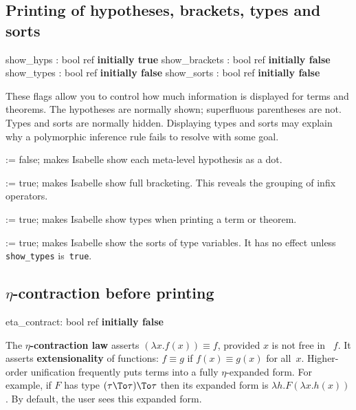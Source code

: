 \subsection{Printing of hypotheses, brackets, types and sorts}
\begin{ttbox} 
show_hyps     : bool ref \hfill{\bf initially true}
show_brackets : bool ref \hfill{\bf initially false}
show_types    : bool ref \hfill{\bf initially false}
show_sorts    : bool ref \hfill{\bf initially false}
\end{ttbox}
These flags allow you to control how much information is displayed for
terms and theorems.  The hypotheses are normally shown; superfluous
parentheses are not.  Types and sorts are normally hidden.  Displaying
types and sorts may explain why a polymorphic inference rule fails to
resolve with some goal.

\begin{ttdescription}
\item[\ttindexbold{show_hyps} := false;]   
makes Isabelle show each meta-level hypothesis as a dot.

\item[\ttindexbold{show_brackets} := true;] 
  makes Isabelle show full bracketing.  This reveals the
  grouping of infix operators.

\item[\ttindexbold{show_types} := true;]
makes Isabelle show types when printing a term or theorem.

\item[\ttindexbold{show_sorts} := true;]
makes Isabelle show the sorts of type variables.  It has no effect unless
{\tt show_types} is~{\tt true}. 
\end{ttdescription}


\subsection{$\eta$-contraction before printing}
\begin{ttbox} 
eta_contract: bool ref \hfill{\bf initially false}
\end{ttbox}
The {\bf $\eta$-contraction law} asserts $(\lambda x.f(x))\equiv f$,
provided $x$ is not free in ~$f$.  It asserts {\bf extensionality} of
functions: $f\equiv g$ if $f(x)\equiv g(x)$ for all~$x$.  Higher-order
unification frequently puts terms into a fully $\eta$-expanded form.  For
example, if $F$ has type $(\tau\To\tau)\To\tau$ then its expanded form is
$\lambda h.F(\lambda x.h(x))$.  By default, the user sees this expanded
form.

